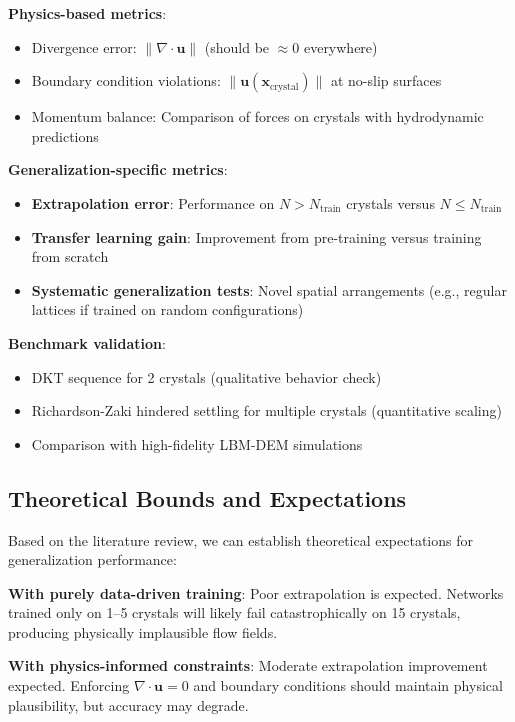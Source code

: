 \textbf{Physics-based metrics}:
\begin{itemize}
    \item Divergence error: $\|\nabla \cdot \mathbf{u}\|$ (should be $\approx 0$ everywhere)
    \item Boundary condition violations: $\|\mathbf{u}(\mathbf{x}_{\text{crystal}})\|$ at no-slip surfaces
    \item Momentum balance: Comparison of forces on crystals with hydrodynamic predictions
\end{itemize}

\textbf{Generalization-specific metrics}:
\begin{itemize}
    \item \textbf{Extrapolation error}: Performance on $N > N_{\text{train}}$ crystals versus $N \leq N_{\text{train}}$
    \item \textbf{Transfer learning gain}: Improvement from pre-training versus training from scratch
    \item \textbf{Systematic generalization tests}: Novel spatial arrangements (e.g., regular lattices if trained on random configurations)
\end{itemize}

\textbf{Benchmark validation}:
\begin{itemize}
    \item DKT sequence for 2 crystals (qualitative behavior check)
    \item Richardson-Zaki hindered settling for multiple crystals (quantitative scaling)
    \item Comparison with high-fidelity LBM-DEM simulations
\end{itemize}

\subsection{Theoretical Bounds and Expectations}

Based on the literature review, we can establish theoretical expectations for generalization performance:

\textbf{With purely data-driven training}: Poor extrapolation is expected. Networks trained only on 1--5 crystals will likely fail catastrophically on 15 crystals, producing physically implausible flow fields.

\textbf{With physics-informed constraints}: Moderate extrapolation improvement expected. Enforcing $\nabla \cdot \mathbf{u} = 0$ and boundary conditions should maintain physical plausibility, but accuracy may degrade.

